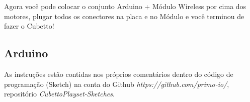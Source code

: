 \documentclass[paper=a4, fontsize=11pt]{scrartcl} %
\numberwithin{equation}{section} %
\numberwithin{figure}{section} %
\numberwithin{table}{section} %
\begin{document}
Agora você pode colocar o conjunto Arduino + Módulo Wireless por cima dos motores, plugar todos os conectores na placa e no Módulo e você terminou de fazer o Cubetto!



\subsection{Arduino}


As instruções estão contidas nos próprios comentários dentro do código de programação (Sketch) na conta do Github \textit{https://github.com/primo-io/}, repositório \textit{CubettoPlayset-Sketches}.
\end{document}
